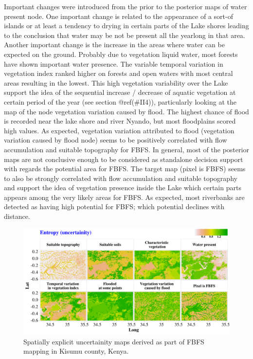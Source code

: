 \documentclass[12pt,oneside]{article}
\begin{document}
Important changes were introduced from the prior to the posterior maps of water present node. One important change is related to the appearance of a sort-of islands or at least a tendency to drying in certain parts of the Lake shores leading to the conclusion that water may be not be present all the yearlong in that area. Another important change is the increase in the areas where water can be expected on the ground. Probably due to vegetation liquid water, most forests have shown important water presence. The variable temporal variation in vegetation index ranked higher on forests and open waters with most central areas resulting in the lowest. This high vegetation variability over the Lake support the idea of the sequential increase / decrease of aquatic vegetation at certain period of the year (see section @ref(\#II4)), particularly looking at the map of the node vegetation variation caused by flood. The highest chance of flood is recorded near the lake shore and river Nyando, but most floodplains scored high values. As expected, vegetation variation attributed to flood (vegetation variation caused by flood node) seems to be positively correlated with flow accumulation and suitable topography for FBFS. In general, most of the posterior maps are not conclusive enough to be considered as standalone decision support with regards the potential area for FBFS. The target map (pixel is FBFS) seems to also be strongly correlated with flow accumulation and suitable topography and support the idea of vegetation presence inside the Lake which certain parts appears among the very likely areas for FBFS. As expected, most riverbanks are detected as having high potential for FBFS; which potential declines with distance.

\begin{figure}
\includegraphics[width=1\linewidth]{figures/Mapping_FBFS_uncertainity_maps} \caption{Spatially explicit uncertainity maps derived as part of FBFS mapping in Kisumu county, Kenya.}\label{fig:fig13}
\end{figure}
\end{document}
